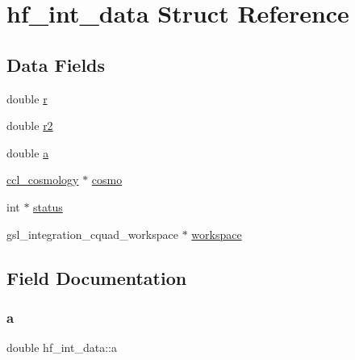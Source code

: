 \hypertarget{structhf__int__data}{}\section{hf\+\_\+int\+\_\+data Struct Reference}
\label{structhf__int__data}
\subsection*{Data Fields}
\begin{DoxyCompactItemize}
\item 
double \mbox{\hyperlink{structhf__int__data_afcabbea1ee0a5dd35a504625cc81ebc4}{r}}
\item 
double \mbox{\hyperlink{structhf__int__data_ae218cdbf681b9b00ded175d5a4a4bc0c}{r2}}
\item 
double \mbox{\hyperlink{structhf__int__data_a2a074ee1419717adc156906a4790da40}{a}}
\item 
\mbox{\hyperlink{structccl__cosmology}{ccl\+\_\+cosmology}} $\ast$ \mbox{\hyperlink{structhf__int__data_aaebddf742f0fccd211c59f74c4fc0cbc}{cosmo}}
\item 
int $\ast$ \mbox{\hyperlink{structhf__int__data_a582dbcc1fc57ecff72089cdd20bb36e1}{status}}
\item 
gsl\+\_\+integration\+\_\+cquad\+\_\+workspace $\ast$ \mbox{\hyperlink{structhf__int__data_a2fe95aa9a0b421a9b06b63d2cef6b446}{workspace}}
\end{DoxyCompactItemize}


\subsection{Field Documentation}
\mbox{\label{structhf__int__data_a2a074ee1419717adc156906a4790da40}} 
\subsubsection{\texorpdfstring{a}{a}}
{\footnotesize\ttfamily double hf\+\_\+int\+\_\+data\+::a}

\mbox{\label{structhf__int__data_aaebddf742f0fccd211c59f74c4fc0cbc}} 
